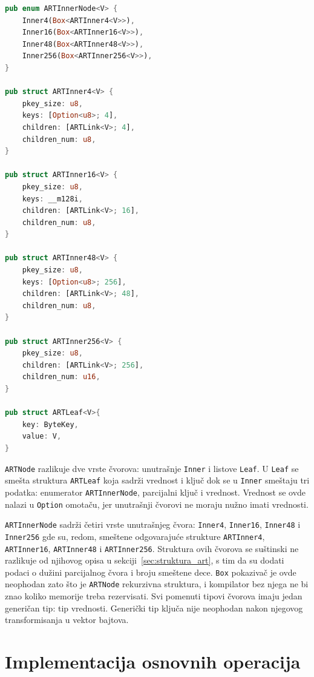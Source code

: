 \documentclass[12pt,oneside]{memoir}
\begin{document}
\begin{lstlisting}[language=Rust,
                   caption={Definicije čvorova
                            koji se nalaze u strukturi \texttt{ARTree}},
                   label={kod:artnode}]
pub enum ARTInnerNode<V> {
    Inner4(Box<ARTInner4<V>>),
    Inner16(Box<ARTInner16<V>>),
    Inner48(Box<ARTInner48<V>>),
    Inner256(Box<ARTInner256<V>>),
}

pub struct ARTInner4<V> {
    pkey_size: u8,
    keys: [Option<u8>; 4],
    children: [ARTLink<V>; 4],
    children_num: u8,
}

pub struct ARTInner16<V> {
    pkey_size: u8,
    keys: __m128i,
    children: [ARTLink<V>; 16],
    children_num: u8,
}

pub struct ARTInner48<V> {
    pkey_size: u8,
    keys: [Option<u8>; 256],
    children: [ARTLink<V>; 48],
    children_num: u8,
}

pub struct ARTInner256<V> {
    pkey_size: u8,
    children: [ARTLink<V>; 256],
    children_num: u16,
}

pub struct ARTLeaf<V>{
    key: ByteKey,
    value: V,
}
\end{lstlisting}

\texttt{ARTNode} razlikuje dve vrste čvorova: unutrašnje \texttt{Inner} i
listove \texttt{Leaf}. U \texttt{Leaf} se smešta struktura \texttt{ARTLeaf}
koja sadrži vrednost i ključ dok se u \texttt{Inner} smeštaju tri podatka:
enumerator \texttt{ARTInnerNode}, parcijalni ključ i vrednost. Vrednost se ovde
nalazi u \texttt{Option} omotaču, jer unutrašnji čvorovi
ne moraju nužno imati vrednosti.

\texttt{ARTInnerNode} sadrži četiri vrste unutrašnjeg čvora:
\texttt{Inner4}, \texttt{Inner16}, \texttt{Inner48} i
\texttt{Inner256} gde su, redom, smeštene odgovarajuće strukture
\texttt{ARTInner4}, \texttt{ARTInner16}, \texttt{ARTInner48} i
\texttt{ARTInner256}. Struktura ovih čvorova se suštinski ne razlikuje od
njihovog opisa u sekciji~\ref{sec:struktura_art}, s tim da su dodati
podaci o dužini parcijalnog čvora i broju smeštene dece.
\texttt{Box} pokazivač je ovde neophodan zato što je \texttt{ARTNode}
rekurzivna struktura, i kompilator bez njega ne bi znao
koliko memorije treba rezervisati.
Svi pomenuti tipovi čvorova imaju jedan generičan
tip: tip vrednosti. Generički tip ključa nije neophodan nakon njegovog
transformisanja u vektor bajtova.

\section{Implementacija osnovnih operacija}
\end{document}
